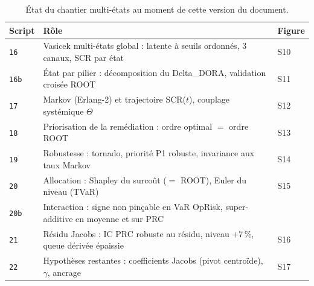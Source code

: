 \documentclass[11pt,a4paper]{article}
\begin{document}
\begin{table}[h]\centering\small
\renewcommand{\arraystretch}{1.25}
\begin{tabularx}{\linewidth}{@{}l X l@{}}
\toprule
Script & Rôle & Figure \\
\midrule
\texttt{16}  & Vasicek multi-états global : latente à seuils ordonnés, 3 canaux, SCR par état & S10 \\
\texttt{16b} & État par pilier : décomposition du Delta\_DORA, validation croisée ROOT & S11 \\
\texttt{17}  & Markov (Erlang-2) et trajectoire SCR($t$), couplage systémique $\Theta$ & S12 \\
\texttt{18}  & Priorisation de la remédiation : ordre optimal $=$ ordre ROOT & S13 \\
\texttt{19}  & Robustesse : tornado, priorité P1 robuste, invariance aux taux Markov & S14 \\
\texttt{20}  & Allocation : Shapley du surcoût ($=$ ROOT), Euler du niveau (TVaR) & S15 \\
\texttt{20b} & Interaction : signe non pinçable en VaR OpRisk, super-additive en moyenne et sur PRC & \textendash{} \\
\texttt{21}  & Résidu Jacobs : IC PRC robuste au résidu, niveau $+7\,\%$, queue dérivée épaissie & S16 \\
\texttt{22}  & Hypothèses restantes : coefficients Jacobs (pivot centroïde), $\gamma$, ancrage & S17 \\
\bottomrule
\end{tabularx}
\caption{État du chantier multi-états au moment de cette version du document.}
\end{table}
\end{document}
